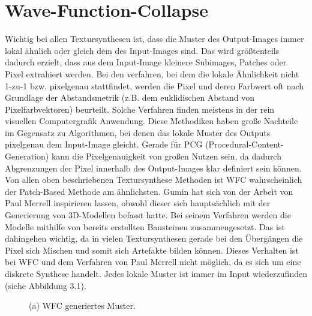 \documentclass[12pt, a4paper,twoside,openright]{report} %
\begin{document}
\chapter{Wave-Function-Collapse}

Wichtig bei allen Textursynthesen ist,
dass die Muster des Output-Images immer lokal ähnlich oder gleich dem des Input-Images sind.
Das wird größtenteils dadurch erzielt, dass aus dem Input-Image kleinere Subimages, Patches oder Pixel extrahiert werden.
Bei den verfahren, bei dem die lokale Ähnlichkeit nicht 1-zu-1 bzw. pixelgenau stattfindet,
werden die Pixel und deren Farbwert oft nach Grundlage der Abstandsmetrik {(z.B. dem euklidischen Abstand von Pixelfarbvektoren)} beurteilt.
Solche Verfahren finden meistens in der rein visuellen Computergrafik Anwendung.
Diese Methodiken haben große Nachteile im Gegensatz zu Algorithmen, bei denen das lokale Muster des Outputs pixelgenau dem Input-Image gleicht.
Gerade für PCG {(Procedural-Content-Generation)} kann die Pixelgenauigkeit von großen Nutzen sein, da dadurch Abgrenzungen der Pixel innerhalb des Output-Images klar definiert sein können.
\cite{Karth2017WaveFunctionCollapseIC}
Von allen oben beschriebenen Textursynthese Methoden ist WFC wahrscheinlich der Patch-Based Methode am ähnlichsten.
\newline
Gumin hat sich von der Arbeit von Paul Merrell inspirieren lassen, obwohl dieser sich hauptsächlich mit der Generierung von 3D-Modellen befasst hatte.
Bei seinem Verfahren werden die Modelle mithilfe von bereits erstellten Bausteinen zusammengesetzt.
Das ist dahingehen wichtig, da in vielen Textursynthesen gerade bei den Übergängen die Pixel sich Mischen und somit sich Artefakte bilden können.
Dieses Verhalten ist bei WFC und dem Verfahren von Paul Merrell nicht möglich, da es sich um eine diskrete Synthese handelt.
Jedes lokale Muster ist immer im Input wiederzufinden {(siehe Abbildung 3.1)}. \cite{Karth2017WaveFunctionCollapseIC, merrell2009model, Gumin_Wave_Function_Collapse_2016}

\begin{figure}[H]
    \centering
    \caption{(a) WFC generiertes Muster.}%
\end{figure}
\end{document}
